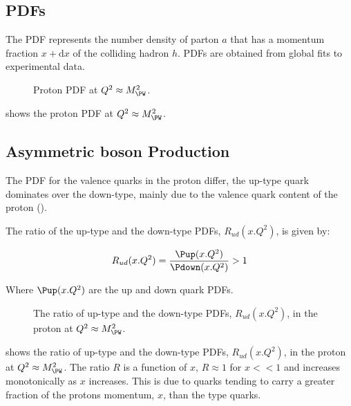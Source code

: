 
\subsection{\acp{PDF}} 
The \ac{PDF} represents the number density of parton $a$ that has a momentum
fraction $x+\mathrm{d}x$ of the colliding hadron $h$.  \acp{PDF} are obtained
from global fits to experimental data. %

\begin{figure}[htb]
  \centering
  \caption{Proton PDF at $Q^2\approx M_{\PW}^2$.}
  \label{wbos:pdf}
\end{figure}

 shows the proton PDF at $Q^2\approx M_{\PW}^2$. 

\subsection{Asymmetric \PW boson Production} 
The \ac{PDF} for the valence quarks in the proton differ, the up-type quark
dominates over the down-type, mainly due to the valence quark content of the
proton (\HepProcess{\Pup\Pup\Pdown}). 

The ratio of the up-type and the down-type \acp{PDF}, $R_{ud}(x.Q^2)$, is given
by:

\begin{equation}
  R_{ud}(x.Q^2) = \frac{\Pup(x.Q^2)}{ \Pdown(x.Q^2)} > 1
\end{equation}

Where $\Pup(x.Q^2)$ are the up and down quark \acp{PDF}.

\begin{figure}[htb]
  \centering
  \caption{The ratio of up-type and the down-type \acp{PDF}, $R_{ud}(x.Q^2)$,
  in the proton at $Q^2\approx M_{\PW}^2$.}
  \label{wbos:pdfrat}
\end{figure}

 shows the ratio of up-type and the down-type \acp{PDF},
$R_{ud}(x.Q^2)$, in the proton at $Q^2\approx M_{\PW}^2$. 
The ratio $R$ is a function of $x$, $R \approx 1$ for $x<<1$ and increases
monotonically as $x$ increases.  
This is due to \Pup quarks tending to carry a greater fraction of the protons
momentum, $x$, than the \Pdown type quarks.

